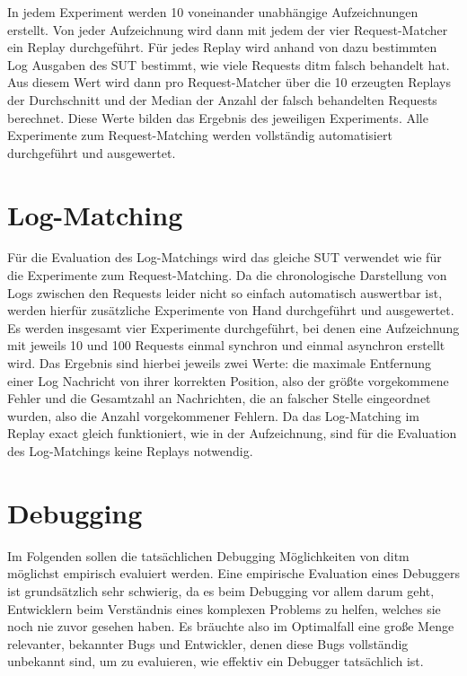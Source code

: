 \documentclass[12pt,a4paper]{report}
\begin{document}
In jedem Experiment werden 10 voneinander unabhängige Aufzeichnungen erstellt. Von jeder Aufzeichnung wird dann mit jedem der vier
Request-Matcher ein Replay durchgeführt. Für jedes Replay wird anhand von dazu bestimmten Log Ausgaben des SUT bestimmt, wie viele
Requests ditm falsch behandelt hat. Aus diesem Wert wird dann pro Request-Matcher über die 10 erzeugten Replays der Durchschnitt
und der Median der Anzahl der falsch behandelten Requests berechnet. Diese Werte bilden das Ergebnis des jeweiligen Experiments.
Alle Experimente zum Request-Matching werden vollständig automatisiert durchgeführt und ausgewertet.

\section{Log-Matching}
Für die Evaluation des Log-Matchings wird das gleiche SUT verwendet wie für die Experimente zum Request-Matching.
Da die chronologische Darstellung von Logs zwischen den Requests leider nicht so einfach automatisch auswertbar ist, werden
hierfür zusätzliche Experimente von Hand durchgeführt und ausgewertet. Es werden insgesamt vier Experimente durchgeführt, bei
denen eine Aufzeichnung mit jeweils 10 und 100 Requests einmal synchron und einmal asynchron erstellt wird. Das Ergebnis sind
hierbei jeweils zwei Werte: die maximale Entfernung einer Log Nachricht von ihrer korrekten Position, also der größte vorgekommene
Fehler und die Gesamtzahl an Nachrichten, die an falscher Stelle eingeordnet wurden, also die Anzahl vorgekommener Fehlern. Da das
Log-Matching im Replay exact gleich funktioniert, wie in der Aufzeichnung, sind für die Evaluation des Log-Matchings keine Replays
notwendig.

\section{Debugging}
\label{chap:debugging_exp}
Im Folgenden sollen die tatsächlichen Debugging Möglichkeiten von ditm möglichst empirisch evaluiert werden. Eine empirische
Evaluation eines Debuggers ist grundsätzlich sehr schwierig, da es beim Debugging vor allem darum geht, Entwicklern beim
Verständnis eines komplexen Problems zu helfen, welches sie noch nie zuvor gesehen haben. Es bräuchte also im Optimalfall eine
große Menge relevanter, bekannter Bugs und Entwickler, denen diese Bugs vollständig unbekannt sind, um zu evaluieren, wie effektiv
ein Debugger tatsächlich ist.
\end{document}
